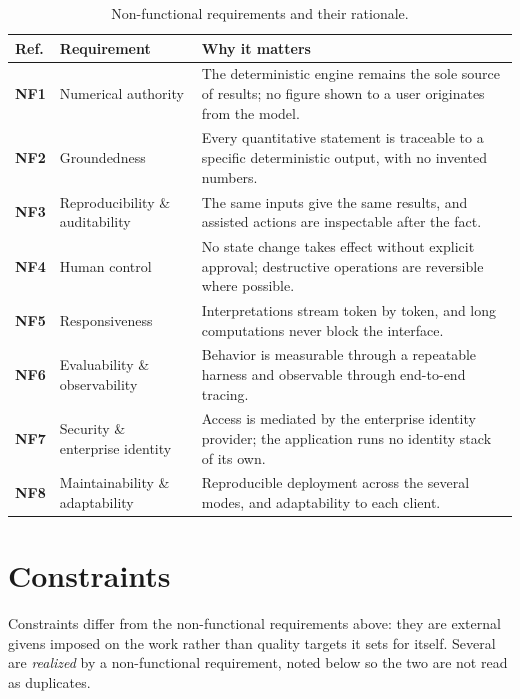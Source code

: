\begin{table}[H]
  \centering
  \small
  \begin{tabularx}{\linewidth}{@{}>{\bfseries}l >{\raggedright\arraybackslash}p{3.4cm} >{\raggedright\arraybackslash}X@{}}
    \toprule
    \textbf{Ref.} & \textbf{Requirement} & \textbf{Why it matters} \\
    \midrule
    NF1 & Numerical authority & The deterministic engine remains the sole source
      of results; no figure shown to a user originates from the model. \\
    \hypertarget{nf:groundedness}{NF2} & Groundedness & Every quantitative statement
      is traceable to a specific deterministic output, with no invented numbers. \\
    NF3 & Reproducibility \& auditability & The same inputs give the same results,
      and assisted actions are inspectable after the fact. \\
    NF4 & Human control & No state change takes effect without explicit approval;
      destructive operations are reversible where possible. \\
    NF5 & Responsiveness & Interpretations stream token by token, and long
      computations never block the interface. \\
    \hypertarget{nf:eval}{NF6} & Evaluability \& observability & Behavior is
      measurable through a repeatable harness and observable through end-to-end
      tracing. \\
    NF7 & Security \& enterprise identity & Access is mediated by the enterprise
      identity provider; the application runs no identity stack of its own. \\
    NF8 & Maintainability \& adaptability & Reproducible deployment across the
      several modes, and adaptability to each client. \\
    \bottomrule
  \end{tabularx}
  \caption{Non-functional requirements and their rationale.}
  \label{tab:nfr}
\end{table}

\section{Constraints}
\label{sec:constraints}

Constraints differ from the non-functional requirements above: they are external
givens imposed on the work rather than quality targets it sets for itself. Several
are \emph{realized} by a non-functional requirement, noted below so the two are not
read as duplicates.

